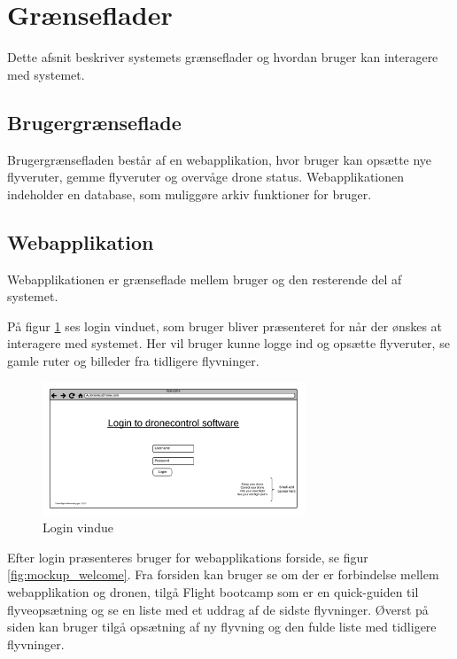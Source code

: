 \section{Grænseflader}
Dette afsnit beskriver systemets grænseflader og hvordan bruger kan interagere med systemet.

\subsection{Brugergrænseflade}
Brugergrænsefladen består af en webapplikation, hvor bruger kan opsætte nye flyveruter, gemme flyveruter og overvåge drone status. Webapplikationen indeholder en database, som muliggøre arkiv funktioner for bruger. 

\subsection{Webapplikation}
Webapplikationen er grænseflade mellem bruger og den resterende del af systemet. 

På figur \ref{fig:mockup_login} ses login vinduet, som bruger bliver præsenteret for når der ønskes at interagere med systemet. Her vil bruger kunne logge ind og opsætte flyveruter, se gamle ruter og billeder fra tidligere flyvninger.

\vspace{-5pt}
\begin{figure}[H]
	\centering
	\includegraphics[width=0.7\textwidth]{Billeder/UI_mockups/login.png}
	\vspace{-5pt}
	\caption{Login vindue}
	\label{fig:mockup_login}
\end{figure}

 \newpage

Efter login præsenteres bruger for webapplikations forside, se figur \ref{fig:mockup_welcome}. 
Fra forsiden kan bruger se om der er forbindelse mellem webapplikation og dronen, tilgå Flight bootcamp som er en quick-guiden til flyveopsætning og se en liste med et uddrag af de sidste flyvninger. Øverst på siden kan bruger tilgå opsætning af ny flyvning og den fulde liste med tidligere flyvninger.

